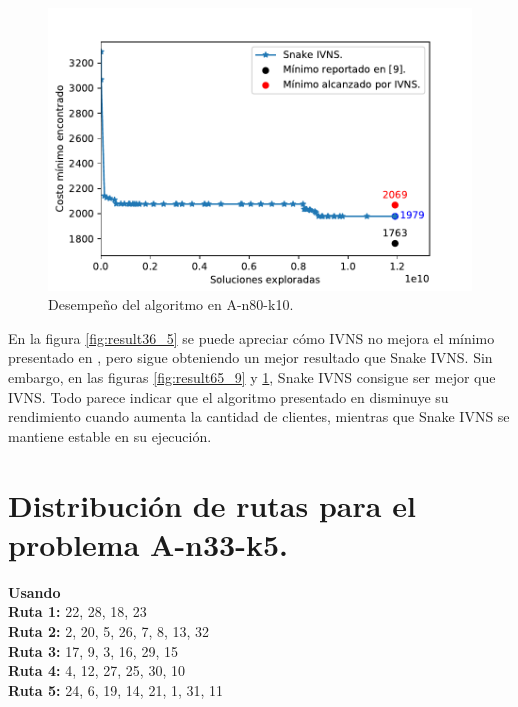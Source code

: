\documentclass[a4paper,10pt,twocolumn]{article}
\begin{document}
	\begin{figure}[H]
		\centering
		\includegraphics[scale=.55]{Graphics/result_A-n80-k10.pdf}
		\caption{Desempeño del algoritmo en A-n80-k10.}\label{fig:result80_10}
	\end{figure}
	
	En la figura \ref{fig:result36_5} se puede apreciar cómo IVNS no mejora el
	mínimo presentado en \cite{neo}, pero sigue obteniendo un mejor resultado que 
	Snake IVNS. Sin embargo, en las figuras \ref{fig:result65_9} y \ref{fig:result80_10},
	Snake IVNS consigue ser mejor que IVNS. Todo parece indicar que el algoritmo presentado
	en \cite{Camila} disminuye su rendimiento cuando aumenta la cantidad de clientes,
	mientras que Snake IVNS se mantiene estable en su ejecución.
	
	\newpage

	\section*{Distribución de rutas para el problema A-n33-k5.}
	\label{tab:result33_5}

	\hspace{9pt} \textbf{Usando }\\				  
	\textbf{Ruta 1:} 22, 28, 18, 23 			  \\
	\textbf{Ruta 2:} 2, 20, 5, 26, 7, 8, 13, 32   \\
	\textbf{Ruta 3:} 17, 9, 3, 16, 29, 15 		  \\
	\textbf{Ruta 4:} 4, 12, 27, 25, 30, 10 		  \\
	\textbf{Ruta 5:} 24, 6, 19, 14, 21, 1, 31, 11 \\
\end{document}
